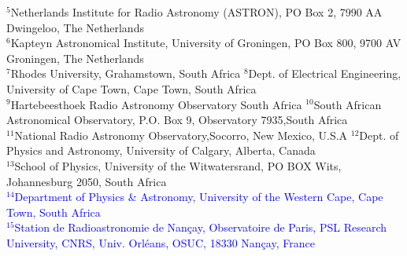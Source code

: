 {$^5$Netherlands Institute for Radio Astronomy (ASTRON), PO Box 2, 7990 AA Dwingeloo, The Netherlands\\
$^6$Kapteyn Astronomical Institute, University of Groningen, PO Box 800, 9700 AV Groningen, The Netherlands\\
$^7$Rhodes University, Grahamstown, South Africa \hfill
$^8$Dept. of Electrical Engineering, University of Cape Town, Cape Town, South Africa\\
$^9$Hartebeesthoek Radio Astronomy Observatory South Africa\hfill
$^{10}$South African Astronomical Observatory, P.O. Box 9, Observatory 7935,South Africa\\
$^{11}$National Radio Astronomy Observatory,Socorro, New Mexico, U.S.A \hspace{0.8cm}
$^{12}$Dept. of Physics and Astronomy, University of Calgary, Alberta, Canada\\
$^{13}$School of Physics, University of the Witwatersrand, PO BOX Wits, Johannesburg 2050, South Africa\\
\textcolor{blue}{$^{14}$Department of Physics \& Astronomy, University of the Western Cape, Cape Town, South Africa}\\
\textcolor{blue}{$^{15}$Station de Radioastronomie de Nan\c{c}ay, Observatoire de Paris, PSL Research University, CNRS, Univ. Orl\'{e}ans, OSUC, 18330 Nan\c{c}ay, France}
}
